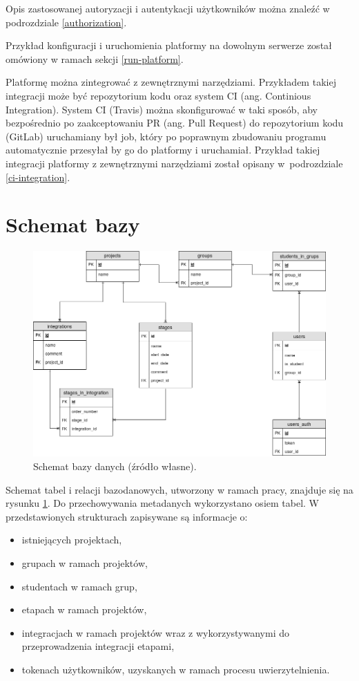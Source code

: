 Opis zastosowanej autoryzacji i autentykacji użytkowników można znaleźć w podrozdziale \ref{authorization}.

Przykład konfiguracji i uruchomienia platformy na dowolnym serwerze został omówiony w ramach sekcji \ref{run-platform}.

Platformę można zintegrować z zewnętrznymi narzędziami.
Przykładem takiej integracji może być repozytorium kodu oraz system CI (ang. Continious Integration).
System CI (Travis) można skonfigurować w taki sposób, aby bezpośrednio po zaakceptowaniu PR (ang. Pull Request) do repozytorium kodu (GitLab) uruchamiany był job, który po poprawnym zbudowaniu programu automatycznie przesyłał by go do platformy i uruchamiał.
Przykład takiej integracji platformy z zewnętrznymi narzędziami został opisany w~podrozdziale \ref{ci-integration}.

\section{Schemat bazy}
\label{database}

\begin{figure}[h]
    \centering
    \includegraphics[width = 13cm]{chapter02/db_schema.png}
    \caption{Schemat bazy danych (źródło własne).}
    \label{fig:platform-db-schema}
\end{figure}

Schemat tabel i relacji bazodanowych, utworzony w ramach pracy, znajduje się na rysunku \ref{fig:platform-db-schema}.
Do przechowywania metadanych wykorzystano osiem tabel.
W przedstawionych strukturach zapisywane są informacje o:
\begin{itemize}
    \item istniejących projektach,
    \item grupach w ramach projektów,
    \item studentach w ramach grup,
    \item etapach w ramach projektów,
    \item integracjach w ramach projektów wraz z wykorzystywanymi do przeprowadzenia integracji etapami,
    \item tokenach użytkowników, uzyskanych w ramach procesu uwierzytelnienia.
\end{itemize}

